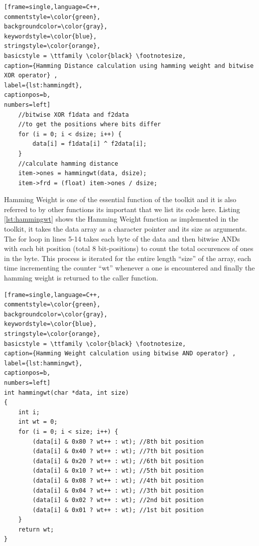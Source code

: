 \begin{center}
\begin{minipage}{0.7\textwidth}
\begin{lstlisting}[frame=single,language=C++,
commentstyle=\color{green},
backgroundcolor=\color{gray},
keywordstyle=\color{blue},
stringstyle=\color{orange},
basicstyle = \ttfamily \color{black} \footnotesize,
caption={Hamming Distance calculation using hamming weight and bitwise XOR operator} ,
label={lst:hammingdt},
captionpos=b,
numbers=left]
    //bitwise XOR f1data and f2data
    //to get the positions where bits differ
    for (i = 0; i < dsize; i++) {
        data[i] = f1data[i] ^ f2data[i];
    }
    //calculate hamming distance
    item->ones = hammingwt(data, dsize);
    item->frd = (float) item->ones / dsize;
\end{lstlisting}
\end{minipage}
\end{center}

Hamming Weight is one of the essential function of the toolkit and it is also referred to by other functions its important that we list its code here. Listing \ref{lst:hammingwt} shows the Hamming Weight function as implemented in the toolkit, it takes the data array as a character pointer and its size as arguments. The for loop in lines 5-14 takes each byte of the data and then bitwise ANDs with each bit position (total 8 bit-positions) to count the total occurences of ones in the byte. This process is
iterated for the entire length ``size'' of the array, each time incrementing the counter ``wt'' whenever a one is encountered and finally the hamming weight is returned to the caller function.\\


\begin{center}
\begin{minipage}{0.7\textwidth}
\begin{lstlisting}[frame=single,language=C++,
commentstyle=\color{green},
backgroundcolor=\color{gray},
keywordstyle=\color{blue},
stringstyle=\color{orange},
basicstyle = \ttfamily \color{black} \footnotesize,
caption={Hamming Weight calculation using bitwise AND operator} ,
label={lst:hammingwt},
captionpos=b,
numbers=left]
int hammingwt(char *data, int size)
{
    int i;
    int wt = 0;
    for (i = 0; i < size; i++) {
        (data[i] & 0x80 ? wt++ : wt); //8th bit position
        (data[i] & 0x40 ? wt++ : wt); //7th bit position
        (data[i] & 0x20 ? wt++ : wt); //6th bit position
        (data[i] & 0x10 ? wt++ : wt); //5th bit position
        (data[i] & 0x08 ? wt++ : wt); //4th bit position
        (data[i] & 0x04 ? wt++ : wt); //3th bit position
        (data[i] & 0x02 ? wt++ : wt); //2nd bit position
        (data[i] & 0x01 ? wt++ : wt); //1st bit position
    }
    return wt;
}
\end{lstlisting}
\end{minipage}
\end{center}

